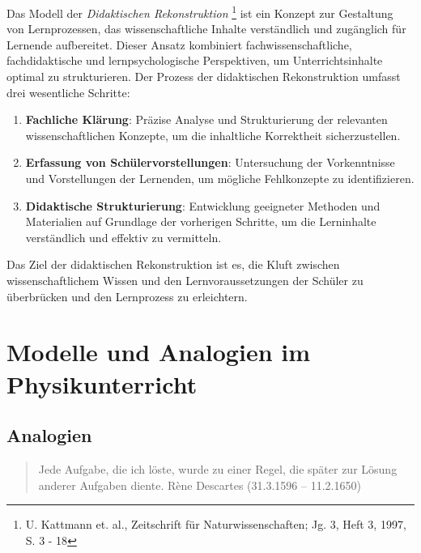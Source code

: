 Das Modell der \textit{Didaktischen Rekonstruktion} \footnote{U. Kattmann et. al., Zeitschrift f\"{u}r Naturwissenschaften; Jg. 3, Heft 3, 1997, S. 3 - 18} ist ein Konzept zur Gestaltung von Lernprozessen, das wissenschaftliche Inhalte verst\"{a}ndlich und zug\"{a}nglich f\"{u}r Lernende aufbereitet. Dieser Ansatz kombiniert fachwissenschaftliche, fachdidaktische und lernpsychologische Perspektiven, um Unterrichtsinhalte optimal zu strukturieren.
\bip
Der Prozess der didaktischen Rekonstruktion umfasst drei wesentliche Schritte:
\begin{enumerate}
    \item \textbf{Fachliche Kl\"{a}rung}: Pr\"{a}zise Analyse und Strukturierung der relevanten wissenschaftlichen Konzepte, um die inhaltliche Korrektheit sicherzustellen.
    \item \textbf{Erfassung von Sch\"{u}lervorstellungen}: Untersuchung der Vorkenntnisse und Vorstellungen der Lernenden, um m\"{o}gliche Fehlkonzepte zu identifizieren.
    \item \textbf{Didaktische Strukturierung}: Entwicklung geeigneter Methoden und Materialien auf Grundlage der vorherigen Schritte, um die Lerninhalte verst\"{a}ndlich und effektiv zu vermitteln.
\end{enumerate}

Das Ziel der didaktischen Rekonstruktion ist es, die Kluft zwischen wissenschaftlichem Wissen und den Lernvoraussetzungen der Sch\"{u}ler zu \"{u}berbr\"{u}cken und den Lernprozess zu erleichtern.



\bip\bip
\section{Modelle und Analogien im Physikunterricht}




\subsection{Analogien}

\begin{quote}
Jede Aufgabe, die ich l\"{o}ste, wurde zu einer Regel, die
sp\"{a}ter zur L\"{o}sung anderer Aufgaben diente.
\q\q R\`ene Descartes (31.3.1596 -- 11.2.1650)
\end{quote}

